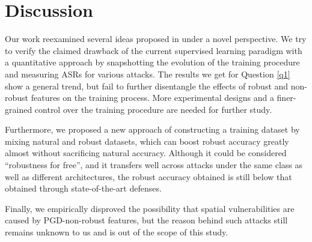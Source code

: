 \section {Discussion}

Our work reexamined several ideas proposed in \cite{Ilyas2019} under a novel perspective. We try to verify the claimed drawback of the current supervised learning paradigm with a quantitative approach by snapshotting the evolution of the training procedure and measuring ASRs for various attacks. The results we get for Question \ref{q1} show a general trend, but fail to further disentangle the effects of robust and non-robust features on the training process. More experimental designs and a finer-grained control over the training procedure are needed for further study.

Furthermore, we proposed a new approach of constructing a training dataset by mixing natural and robust datasets, which can boost robust accuracy greatly almost without sacrificing natural accuracy. Although it could be considered ``robustness for free'', and it transfers well across attacks under the same class as well as different architectures, the robust accuracy obtained is still below that obtained through state-of-the-art defenses.

Finally, we empirically disproved the possibility that spatial vulnerabilities are caused by PGD-non-robust features, but the reason behind such attacks still remains unknown to us and is out of the scope of this study.